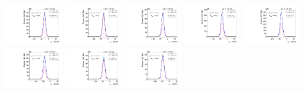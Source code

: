 \begin{figure}[htb]
\includegraphics[width=0.19\textwidth]{plots/Appendix_Recoil_Fits/WmmMC_PF_5TeV_2G/pfu1fit_16.pdf}
\includegraphics[width=0.19\textwidth]{plots/Appendix_Recoil_Fits/WmmMC_PF_5TeV_2G/pfu1fit_17.pdf}
\includegraphics[width=0.19\textwidth]{plots/Appendix_Recoil_Fits/WmmMC_PF_5TeV_2G/pfu1fit_18.pdf}
\includegraphics[width=0.19\textwidth]{plots/Appendix_Recoil_Fits/WmmMC_PF_5TeV_2G/pfu1fit_19.pdf}
\includegraphics[width=0.19\textwidth]{plots/Appendix_Recoil_Fits/WmmMC_PF_5TeV_2G/pfu1fit_20.pdf}
\includegraphics[width=0.19\textwidth]{plots/Appendix_Recoil_Fits/WmmMC_PF_5TeV_2G/pfu1fit_21.pdf}
\includegraphics[width=0.19\textwidth]{plots/Appendix_Recoil_Fits/WmmMC_PF_5TeV_2G/pfu1fit_22.pdf}
\includegraphics[width=0.19\textwidth]{plots/Appendix_Recoil_Fits/WmmMC_PF_5TeV_2G/pfu1fit_23.pdf}

\end{figure}
